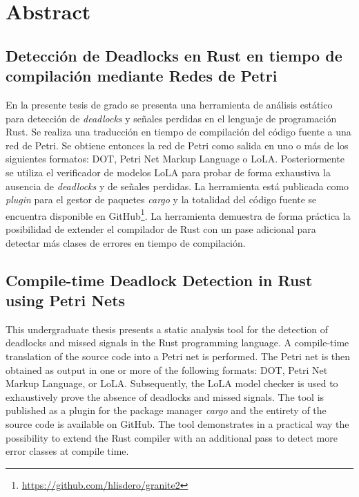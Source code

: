 \clearpage

\chapter*{\centering Abstract}

\section*{Detección de Deadlocks en Rust en tiempo de compilación mediante Redes de Petri}

En la presente tesis de grado se presenta una herramienta de análisis estático
para detección de \textit{deadlocks} y señales perdidas en el lenguaje de programación Rust.
Se realiza una traducción en tiempo de compilación del código fuente a una red de Petri.
Se obtiene entonces la red de Petri como salida en uno o más de los siguientes formatos:
DOT, Petri Net Markup Language o LoLA.
Posteriormente se utiliza el verificador de modelos LoLA
para probar de forma exhaustiva la ausencia de \textit{deadlocks} y de señales perdidas.
La herramienta está publicada como \textit{plugin} para el gestor de paquetes \textit{cargo}
y la totalidad del código fuente se encuentra disponible
en GitHub\footnote[1]{\url{https://github.com/hlisdero/granite2}}.
La herramienta demuestra de forma práctica la posibilidad
de extender el compilador de Rust con un pase adicional para
detectar más clases de errores en tiempo de compilación.

\section*{Compile-time Deadlock Detection in Rust using Petri Nets}

This undergraduate thesis presents a static analysis tool
for the detection of deadlocks and missed signals in the Rust programming language.
A compile-time translation of the source code into a Petri net is performed.
The Petri net is then obtained as output in one or more of the following formats:
DOT, Petri Net Markup Language, or LoLA.
Subsequently, the LoLA model checker is used
to exhaustively prove the absence of deadlocks and missed signals.
The tool is published as a plugin for the package manager \textit{cargo} and
the entirety of the source code is available on GitHub\footnotemark[1].
The tool demonstrates in a practical way the possibility
to extend the Rust compiler with an additional pass
to detect more error classes at compile time.
